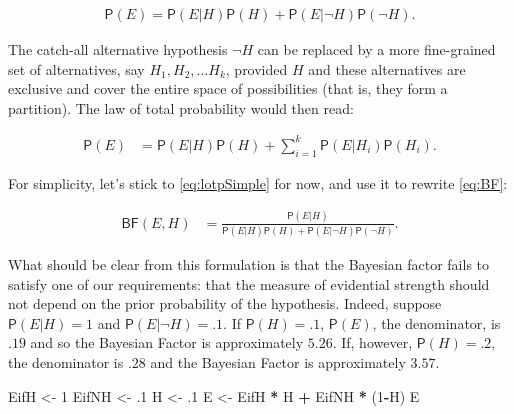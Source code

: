 \documentclass[10pt,dvipsnames,enabledeprecatedfontcommands]{scrartcl}
\newenvironment{Shaded}{\begin{snugshade}}{\end{snugshade}}
\newcommand{\DecValTok}[1]{\textcolor[rgb]{0.00,0.00,0.81}{#1}}
\newcommand{\FloatTok}[1]{\textcolor[rgb]{0.00,0.00,0.81}{#1}}
\newcommand{\StringTok}[1]{\textcolor[rgb]{0.31,0.60,0.02}{#1}}
\newcommand{\OperatorTok}[1]{\textcolor[rgb]{0.81,0.36,0.00}{\textbf{#1}}}
\newcommand{\NormalTok}[1]{#1}
\newcommand{\pr}[1]{\mathsf{P}(#1)}
\begin{document}
\vspace{-3mm}

\begin{align} \label{eq:lotpSimple}
\pr{E}= \pr{E \vert H} \pr{H}+\pr{E \vert \neg H} \pr{\neg H}.
\end{align}

\noindent The catch-all alternative hypothesis \(\neg H\) can be
replaced by a more fine-grained set of alternatives, say
\(H_1, H_2, \dots H_k\), provided \(H\) and these alternatives are
exclusive and cover the entire space of possibilities (that is, they
form a partition). The law of total probability would then read:

\begin{align} \label{eq:lotpLong}
\pr{E} & = \pr{E\vert H}\pr{H} +\sum_{i=1}^k \pr{E\vert H_i}\pr{H_i}. 
\end{align}

\noindent For simplicity, let's stick to \eqref{eq:lotpSimple} for now,
and use it to rewrite \eqref{eq:BF}:

\begin{align}\label{eq:BFlotp}
\mathsf{BF}(E,H) & = \frac{\pr{E \vert H}}{\pr{E \vert H} \pr{H}+\pr{E \vert \neg H} \pr{\neg H}}.
\end{align}

\noindent What should be clear from this formulation is that the
Bayesian factor fails to satisfy one of our requirements: that the
measure of evidential strength should not depend on the prior
probability of the hypothesis. Indeed, suppose \(\pr{E \vert H} = 1\)
and \(\pr{E \vert \neg H} = .1\). If \(\pr{H}=.1\), \(\pr{E}\), the
denominator, is \(.19\) and so the Bayesian Factor is approximately
\(5.26\). If, however, \(\pr{H} =.2\), the denominator is \(.28\) and
the Bayesian Factor is approximately
\(3.57\).

\footnotesize

\begin{Shaded}
\begin{Highlighting}[]
\NormalTok{EifH <-}\StringTok{ }\DecValTok{1}
\NormalTok{EifNH <-}\StringTok{ }\FloatTok{.1}
\NormalTok{H <-}\StringTok{ }\FloatTok{.1}
\NormalTok{E <-}\StringTok{ }\NormalTok{EifH }\OperatorTok{*}\StringTok{ }\NormalTok{H }\OperatorTok{+}\StringTok{ }\NormalTok{EifNH }\OperatorTok{*}\StringTok{ }\NormalTok{(}\DecValTok{1}\OperatorTok{-}\NormalTok{H)}
\NormalTok{E}
\end{Highlighting}
\end{Shaded}
\end{document}
